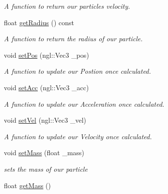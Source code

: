 \begin{DoxyCompactItemize}
\begin{DoxyCompactList}\small\item\em A function to return our particles velocity. \end{DoxyCompactList}\item 
\hypertarget{classparticle_ae5bff0edd62b18cabdd334b6d70d37a7}{float \hyperlink{classparticle_ae5bff0edd62b18cabdd334b6d70d37a7}{get\-Radius} () const }\label{classparticle_ae5bff0edd62b18cabdd334b6d70d37a7}

\begin{DoxyCompactList}\small\item\em A function to return the radius of our particle. \end{DoxyCompactList}\item 
void \hyperlink{classparticle_ab5e66d4d32f574767b9fd930224ae5ca}{set\-Pos} (ngl\-::\-Vec3 \-\_\-pos)
\begin{DoxyCompactList}\small\item\em A function to update our Postion once calculated. \end{DoxyCompactList}\item 
void \hyperlink{classparticle_a7802fa188578565fe14ae6701366e99e}{set\-Acc} (ngl\-::\-Vec3 \-\_\-acc)
\begin{DoxyCompactList}\small\item\em A function to update our Acceleration once calculated. \end{DoxyCompactList}\item 
void \hyperlink{classparticle_a63a467234510f284bb9a6ce9f3948be2}{set\-Vel} (ngl\-::\-Vec3 \-\_\-vel)
\begin{DoxyCompactList}\small\item\em A function to update our Velocity once calculated. \end{DoxyCompactList}\item 
void \hyperlink{classparticle_a2d12e2ddf643d3c3c9d76fbc37be76af}{set\-Mass} (float \-\_\-mass)
\begin{DoxyCompactList}\small\item\em sets the mass of our particle \end{DoxyCompactList}\item 
\hypertarget{classparticle_a9580ed056e4454fb9af79f98f2283497}{float \hyperlink{classparticle_a9580ed056e4454fb9af79f98f2283497}{get\-Mass} ()}\label{classparticle_a9580ed056e4454fb9af79f98f2283497}


\end{DoxyCompactItemize}
